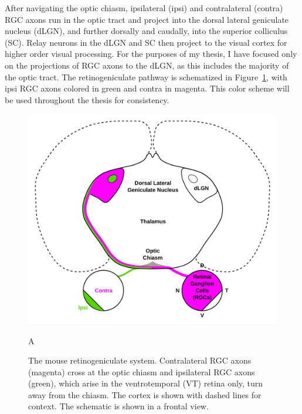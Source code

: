 After navigating the optic chiasm, ipsilateral (ipsi) and contralateral (contra) RGC axons run in the optic tract and project into the dorsal lateral geniculate nucleus (dLGN), and further dorsally and caudally, into the superior colliculus (SC).
Relay neurons in the dLGN and SC then project to the visual cortex for higher order visual processing.
For the purposes of my thesis, I have focused only on the projections of RGC axons to the dLGN, as this includes the majority of the optic tract.
The retinogeniculate pathway is schematized in Figure~\ref{figures/RGP_Schema}, with ipsi RGC axons colored in green and contra in magenta.
This color scheme will be used throughout the thesis for consistency.
\begin{figure}[hbtp]
	\begin{center}
		\includegraphics[width=\textwidth]{figures/RGP_Schema.svg}
		\caption{The mouse retinogeniculate system. Contralateral RGC axons (magenta) cross at the optic chiasm and ipsilateral RGC axons (green), which arise in the ventrotemporal (VT) retina only, turn away from the chiasm. The cortex is shown with dashed lines for context. The schematic is shown in a frontal view.}
		\label{figures/RGP_Schema}
A\end{center}
\end{figure}

